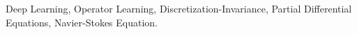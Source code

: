 \documentclass[twoside,12pt]{ctexart}
\begin{document}
\maketitle


\begin{abstract}


 
\end{abstract}

\begin{keywords}
  Deep Learning, Operator Learning, Discretization-Invariance, Partial Differential Equations, Navier-Stokes Equation.
\end{keywords}

%
%





%
%





%
%





%
%










\end{document}
